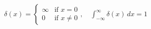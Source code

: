\documentclass[preview]{standalone}
\begin{document}
\begin{align*}
\delta(x) = \begin{cases} \infty & \text{if } x = 0 \\ 0 & \text{if } x \neq 0 \end{cases}, \quad \int_{-\infty}^{\infty} \delta(x) \, dx = 1
\end{align*}
\end{document}
